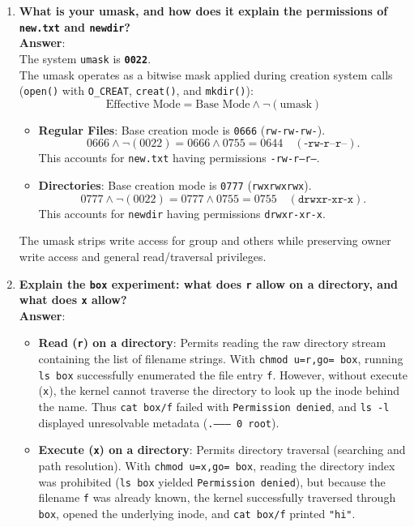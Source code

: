 \documentclass[12pt,a4paper]{article}
\begin{document}
\begin{enumerate}
    \item \textbf{What is your umask, and how does it explain the permissions of \texttt{new.txt} and \texttt{newdir}?} \\
    \textbf{Answer}: \\
    The system \texttt{umask} is \textbf{\texttt{0022}}. \\
    The umask operates as a bitwise mask applied during creation system calls (\texttt{open()} with \texttt{O\_CREAT}, \texttt{creat()}, and \texttt{mkdir()}):
    \[
    \text{Effective Mode} = \text{Base Mode} \land \neg(\text{umask})
    \]
    \begin{itemize}
        \item \textbf{Regular Files}: Base creation mode is \texttt{0666} (\texttt{rw-rw-rw-}).
        \[
        0666 \land \neg(0022) = 0666 \land 0755 = 0644 \quad (\texttt{-rw-r--r--}).
        \]
        This accounts for \texttt{new.txt} having permissions \texttt{-rw-r--r--}.
        \item \textbf{Directories}: Base creation mode is \texttt{0777} (\texttt{rwxrwxrwx}).
        \[
        0777 \land \neg(0022) = 0777 \land 0755 = 0755 \quad (\texttt{drwxr-xr-x}).
        \]
        This accounts for \texttt{newdir} having permissions \texttt{drwxr-xr-x}.
    \end{itemize}
    The umask strips write access for group and others while preserving owner write access and general read/traversal privileges.

    \item \textbf{Explain the \texttt{box} experiment: what does \texttt{r} allow on a directory, and what does \texttt{x} allow?} \\
    \textbf{Answer}:
    \begin{itemize}
        \item \textbf{Read (\texttt{r}) on a directory}: Permits reading the raw directory stream containing the list of filename strings. With \texttt{chmod u=r,go= box}, running \texttt{ls box} successfully enumerated the file entry \texttt{f}. However, without execute (\texttt{x}), the kernel cannot traverse the directory to look up the inode behind the name. Thus \texttt{cat box/f} failed with \texttt{Permission denied}, and \texttt{ls -l} displayed unresolvable metadata (\texttt{.--------- 0 root}).
        \item \textbf{Execute (\texttt{x}) on a directory}: Permits directory traversal (searching and path resolution). With \texttt{chmod u=x,go= box}, reading the directory index was prohibited (\texttt{ls box} yielded \texttt{Permission denied}), but because the filename \texttt{f} was already known, the kernel successfully traversed through \texttt{box}, opened the underlying inode, and \texttt{cat box/f} printed \texttt{"hi"}.
    \end{itemize}


\end{enumerate}
\end{document}

